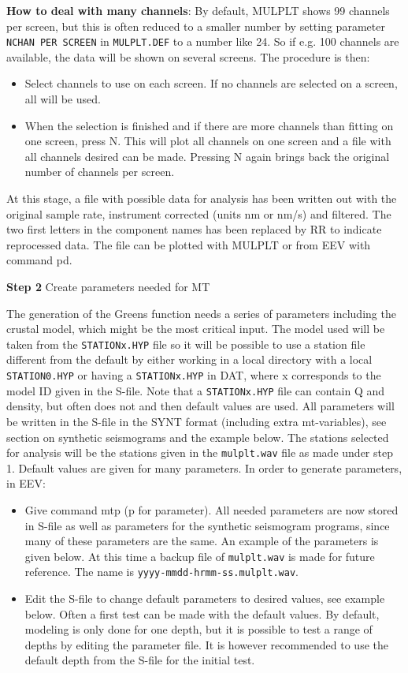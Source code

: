 \textbf{How to deal with many channels}: By default, MULPLT shows 99 channels per screen, but this is often reduced to a smaller number by setting parameter \texttt{NCHAN PER SCREEN} in \texttt{MULPLT.DEF} to a number like 24. So if e.g. 100 channels are available, the data will be shown on several screens. The procedure is then:

\begin{itemize}
\item Select channels to use on each screen. If no channels are selected on a screen, all will be used.
\item When the selection is finished and if there are more channels than fitting on one screen, press N. This will plot all channels on one screen and a file with all channels desired can be made. Pressing N again brings back the original number of channels per screen.
\end{itemize}

At this stage, a file with possible data for analysis has been written out with the original sample rate, instrument corrected (units nm or nm/s) and filtered. The two first letters in the component names has been replaced by RR to indicate reprocessed data. The file can be plotted with MULPLT or from EEV with command pd.

\textbf{Step 2} Create parameters needed for MT

The generation of the Greens function needs a series of parameters including the crustal model, which might be the most critical input. The model used will be taken from the \texttt{STATIONx.HYP} file so it will be possible to use a station file different from the default by either working in a local directory with a local \texttt{STATION0.HYP} or having a \texttt{STATIONx.HYP} in DAT, where x corresponds to the model ID given in the S-file. Note that a \texttt{STATIONx.HYP} file can contain Q and density, but often does not and then default values are used. All parameters will be written in the S-file in the SYNT format (including extra mt-variables), see section on synthetic seismograms and the example below.  The stations selected for analysis will be the stations given in the \texttt{mulplt.wav} file as made under step 1. Default values are given for many parameters. In order to generate parameters, in EEV:

\begin{itemize}
\item 
Give command mtp (p for parameter). All needed parameters are now stored in S-file as well as parameters for the synthetic seismogram programs, since many of these parameters are the same.  An example of the parameters is given below. At this time a backup file of \texttt{mulplt.wav} is made for future reference. The name is \texttt{yyyy-mmdd-hrmm-ss.mulplt.wav}.
\item Edit the S-file to change default parameters to desired values, see example below. Often a first test can be made with the default values. By default, modeling is only done for one depth, but it is possible to test a range of depths by editing the parameter file. It is however recommended to use the default depth from the S-file for the initial test.
\end{itemize}

